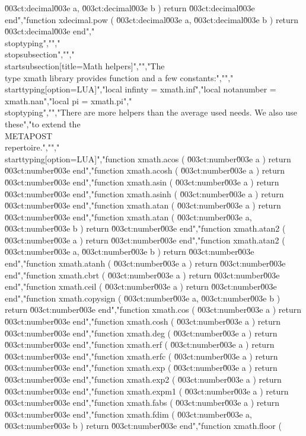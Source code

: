 \u003ct:decimal\u003e a, \u003ct:decimal\u003e b ) return \u003ct:decimal\u003e end","function xdecimal.pow ( \u003ct:decimal\u003e a, \u003ct:decimal\u003e b ) return \u003ct:decimal\u003e end","\\stoptyping","","\\stopsubsection","","\\startsubsection[title=Math helpers]","","The \\type {xmath} library provides function and a few constants:","","\\starttyping[option=LUA]","local infinty    = xmath.inf","local notanumber = xmath.nan","local pi         = xmath.pi","\\stoptyping","","There are more helpers than the average used needs. We also use these","to extend the \\METAPOST\\ repertoire.","","\\starttyping[option=LUA]","function xmath.acos       ( \u003ct:number\u003e a )               return \u003ct:number\u003e end","function xmath.acosh      ( \u003ct:number\u003e a )               return \u003ct:number\u003e end","function xmath.asin       ( \u003ct:number\u003e a )               return \u003ct:number\u003e end","function xmath.asinh      ( \u003ct:number\u003e a )               return \u003ct:number\u003e end","function xmath.atan       ( \u003ct:number\u003e a )               return \u003ct:number\u003e end","function xmath.atan       ( \u003ct:number\u003e a, \u003ct:number\u003e b ) return \u003ct:number\u003e end","function xmath.atan2      ( \u003ct:number\u003e a )               return \u003ct:number\u003e end","function xmath.atan2      ( \u003ct:number\u003e a, \u003ct:number\u003e b ) return \u003ct:number\u003e end","function xmath.atanh      ( \u003ct:number\u003e a )               return \u003ct:number\u003e end","function xmath.cbrt       ( \u003ct:number\u003e a )               return \u003ct:number\u003e end","function xmath.ceil       ( \u003ct:number\u003e a )               return \u003ct:number\u003e end","function xmath.copysign   ( \u003ct:number\u003e a, \u003ct:number\u003e b ) return \u003ct:number\u003e end","function xmath.cos        ( \u003ct:number\u003e a )               return \u003ct:number\u003e end","function xmath.cosh       ( \u003ct:number\u003e a )               return \u003ct:number\u003e end","function xmath.deg        ( \u003ct:number\u003e a )               return \u003ct:number\u003e end","function xmath.erf        ( \u003ct:number\u003e a )               return \u003ct:number\u003e end","function xmath.erfc       ( \u003ct:number\u003e a )               return \u003ct:number\u003e end","function xmath.exp        ( \u003ct:number\u003e a )               return \u003ct:number\u003e end","function xmath.exp2       ( \u003ct:number\u003e a )               return \u003ct:number\u003e end","function xmath.expm1      ( \u003ct:number\u003e a )               return \u003ct:number\u003e end","function xmath.fabs       ( \u003ct:number\u003e a )               return \u003ct:number\u003e end","function xmath.fdim       ( \u003ct:number\u003e a, \u003ct:number\u003e b ) return \u003ct:number\u003e end","function xmath.floor      ( 